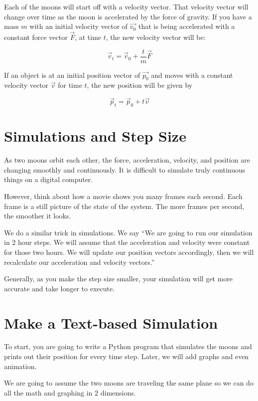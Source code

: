 Each of the moons will start off with a velocity vector. That velocity vector will change over time as the moon is
accelerated by the force of gravity.  If you have a mass $m$ with an initial velocity vector of $\vec{v_0}$ that is being accelerated with a constant force vector $\vec{F}$, at time $t$, the new velocity vector will be:

$$\vec{v}_t = \vec{v}_0  + \frac{t}{m}  \vec{F}$$

If an object is at an initial position vector of $\vec{p_0}$ and moves with a constant velocity vector $\vec{v}$ 
for time $t$,  the new position will be given by 

$$\vec{p}_t = \vec{p}_0  + t \vec{v}$$

\section{Simulations and Step Size}

As two moons orbit each other,  the force, acceleration, velocity, and position are changing smoothly and continuously.  It is difficult to simulate truly continuous things on a digital computer.

However,  think about how a movie shows you many frames each second.   Each frame is a still picture of the 
state of the system.  The more frames per second,  the smoother it looks.

We do a similar trick in simulations. We say ``We are going to run our simulation in 2 hour steps. We will assume
that the acceleration and velocity were constant for those two hours.   We will update our position vectors accordingly, then we will recalculate our acceleration and velocity vectors.'' 

Generally, as you make the step size smaller,  your simulation will get more accurate and take longer to execute.

\section{Make a Text-based Simulation}

To start, you are going to write a Python program that simulates the moons and prints out their
position for every time step.  Later, we will add graphs and even animation.

We are going to assume the two moons are traveling the same plane so we can do all the math and graphing 
in 2 dimensions.

